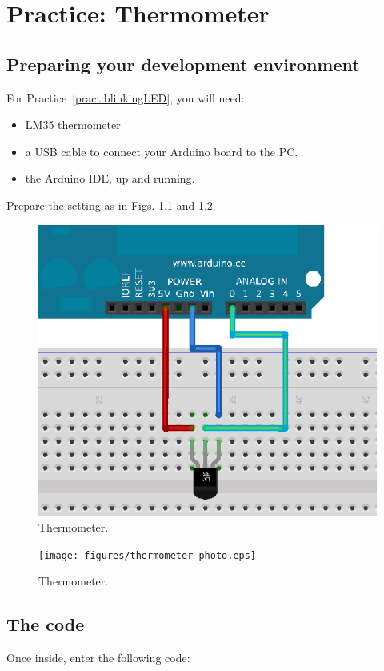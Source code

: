 \chapter{Practice: Thermometer}\label{pract:thermometer}


\section{Preparing your development environment}
For Practice~\ref{pract:blinkingLED}, you will need:
\begin{itemize}
 \item LM35 thermometer
 \item a USB cable to connect your Arduino board to the PC.
 \item the Arduino IDE, up and running.
\end{itemize}

Prepare the setting as in Figs. \ref{fig:thermometer-fritzing} and \ref{fig:thermometer-photo}.


\begin{figure}[htbp]
  \centering
  \includegraphics[width=0.7\linewidth]{figures/thermometer-fritzing.eps}
  \caption{Thermometer.}
  \label{fig:thermometer-fritzing}
\end{figure}

\begin{figure}[htbp]
  \centering
  \texttt{[image: figures/thermometer-photo.eps]}
  \caption{Thermometer.}
  \label{fig:thermometer-photo}
\end{figure}

\section{The code} 
Once inside, enter the following code:

